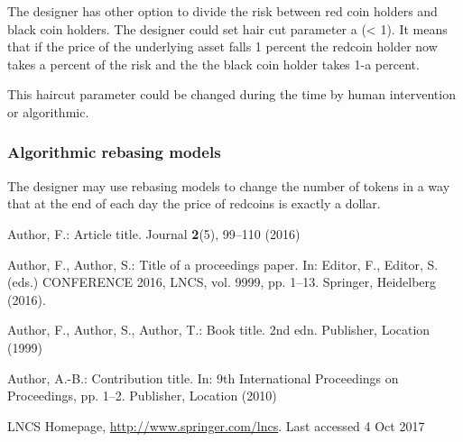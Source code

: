 \documentclass[runningheads]{llncs}
\begin{document}
The designer has other option to divide the risk between red coin holders and black coin holders. The designer could set hair cut parameter a (< 1). It means that if the price of the underlying asset falls 1 percent the redcoin holder now takes a percent of the risk and the the black coin holder takes 1-a percent.

This haircut parameter could be changed during the time by human intervention or algorithmic.


\subsubsection{Algorithmic rebasing models}

The designer may use rebasing models to change the number of tokens in a way that at the end of each day the price of redcoins is exactly a dollar.
%
%
%
% 
% 
%
\begin{thebibliography}{8}
Author, F.: Article title. Journal \textbf{2}(5), 99--110 (2016)

Author, F., Author, S.: Title of a proceedings paper. In: Editor,
F., Editor, S. (eds.) CONFERENCE 2016, LNCS, vol. 9999, pp. 1--13.
Springer, Heidelberg (2016). 

Author, F., Author, S., Author, T.: Book title. 2nd edn. Publisher,
Location (1999)

Author, A.-B.: Contribution title. In: 9th International Proceedings
on Proceedings, pp. 1--2. Publisher, Location (2010)

LNCS Homepage, \url{http://www.springer.com/lncs}. Last accessed 4
Oct 2017
\end{thebibliography}
\end{document}
